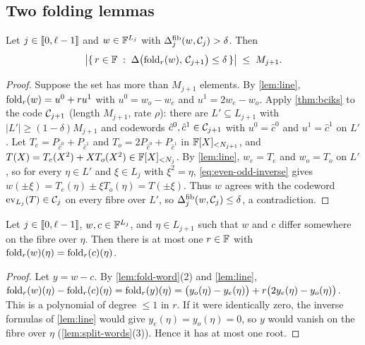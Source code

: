 \subsection{Two folding lemmas}\label{sec:sound:lemmas}

\begin{lemma}\label{lem:far}
Let $j \in \llbracket 0, \ell-1 \rrbracket$ and $w \in \mathbb{F}^{L_j}$ with $\Delta^{\mathrm{fib}}_j(w, \mathcal{C}_j) > \delta$. Then
\[
  \bigl|\{\, r \in \mathbb{F} \;:\; \Delta\bigl(\mathrm{fold}_r(w),\, \mathcal{C}_{j+1}\bigr) \le \delta \,\}\bigr| \;\le\; M_{j+1}.
\]
\end{lemma}

\begin{proof}
Suppose the set has more than $M_{j+1}$ elements. By \cref{lem:line}, $\mathrm{fold}_r(w) = u^0 + r u^1$ with $u^0 = w_o - w_e$ and $u^1 = 2w_e - w_o$.
Apply \cref{thm:bciks} to the code $\mathcal{C}_{j+1}$ (length $M_{j+1}$, rate $\rho$): there are $L' \subseteq L_{j+1}$ with $|L'| \ge (1-\delta)M_{j+1}$ and codewords $\hat c^0, \hat c^1 \in \mathcal{C}_{j+1}$ with $u^0 = \hat c^0$ and $u^1 = \hat c^1$ on $L'$.
Let $T_e = P_{\hat c^0} + P_{\hat c^1}$ and $T_o = 2P_{\hat c^0} + P_{\hat c^1}$ in $\mathbb{F}[X]_{<N_{j+1}}$, and $T(X) = T_e(X^2) + X T_o(X^2) \in \mathbb{F}[X]_{<N_j}$.
By \cref{lem:line}, $w_e = T_e$ and $w_o = T_o$ on $L'$, so for every $\eta \in L'$ and $\xi \in L_j$ with $\xi^2 = \eta$, \eqref{eq:even-odd-inverse} gives
$w(\pm \xi) = T_e(\eta) \pm \xi T_o(\eta) = T(\pm \xi)$.
Thus $w$ agrees with the codeword $\mathrm{ev}_{L_j}(T) \in \mathcal{C}_j$ on every fibre over $L'$, so $\Delta^{\mathrm{fib}}_j(w, \mathcal{C}_j) \le \delta$, a contradiction.
\end{proof}

\begin{lemma}\label{lem:survive}
Let $j \in \llbracket 0, \ell-1 \rrbracket$, $w, c \in \mathbb{F}^{L_j}$, and $\eta \in L_{j+1}$ such that $w$ and $c$ differ somewhere on the fibre over $\eta$. Then there is at most one $r \in \mathbb{F}$ with $\mathrm{fold}_r(w)(\eta) = \mathrm{fold}_r(c)(\eta)$.
\end{lemma}

\begin{proof}
Let $y = w - c$. By \cref{lem:fold-word}(2) and \cref{lem:line}, $\mathrm{fold}_r(w)(\eta) - \mathrm{fold}_r(c)(\eta) = \mathrm{fold}_r(y)(\eta) = \bigl(y_o(\eta) - y_e(\eta)\bigr) + r\bigl(2y_e(\eta) - y_o(\eta)\bigr)$.
This is a polynomial of degree $\le 1$ in $r$. If it were identically zero, the inverse formulas of \cref{lem:line} would give $y_e(\eta) = y_o(\eta) = 0$, so $y$ would vanish on the fibre over $\eta$ (\cref{lem:split-words}(3)). Hence it has at most one root.
\end{proof}

